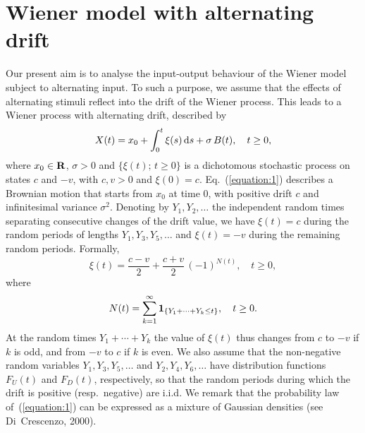 \section{Wiener model with alternating drift}\label{section:3}
Our present aim is to analyse the input-output behaviour of the Wiener model
subject to alternating input. To such a purpose, we assume that the 
effects of alternating stimuli reflect into the drift of the Wiener process. 
This leads to a Wiener process with alternating drift, described by 
\begin{equation}
 X(t)=x_0+\int_0^t \xi(s)\,{\rm d}s+\sigma\,B(t), 
 \quad t\geq 0,
 \label{equation:1}
\end{equation}
where $x_0\in{\bf R}$, $\sigma>0$ and $\{\xi(t);\,t\geq 0\}$ is a dichotomous 
stochastic process on states $c$ and $-v$, with $c,v>0$ and $\xi(0)=c$. 
Eq.~(\ref{equation:1}) describes a Brownian motion that starts from $x_0$ 
at time $0$, with positive drift $c$ and infinitesimal variance $\sigma^2$. 
Denoting by $Y_1,Y_2,\ldots$ the independent random times separating consecutive 
changes of the drift value, we have $\xi(t)=c$ during the random periods of 
lengths $Y_1,Y_3,Y_5,\ldots$ and $\xi(t)=-v$ during the remaining random 
periods. Formally, 
$$
 \xi(t)=\frac{c-v}{2}+\frac{c+v}{2}\,(-1)^{N(t)}, 
 \quad t\geq 0,
$$
where 
$$
 N(t)=\sum_{k=1}^{\infty}{\bf 1}_{\{Y_1+\cdots+Y_k\leq t\}}, 
 \quad t\geq 0.
$$
At the random times $Y_1+\cdots+Y_k$ the value of $\xi(t)$ thus 
changes from $c$ to $-v$ if $k$ is odd, and from $-v$ to $c$ if $k$ 
is even. We also assume that the non-negative 
random variables $Y_1,Y_3,Y_5,\ldots$ and $Y_2,Y_4,Y_6,\ldots$ have 
distribution functions $F_U(t)$ and $F_D(t)$, respectively, so that 
the random periods during which the drift is positive (resp.\ negative) 
are i.i.d. We remark that the probability law of~(\ref{equation:1}) can 
be expressed as a mixture of Gaussian densities (see Di~Crescenzo, 2000).  
